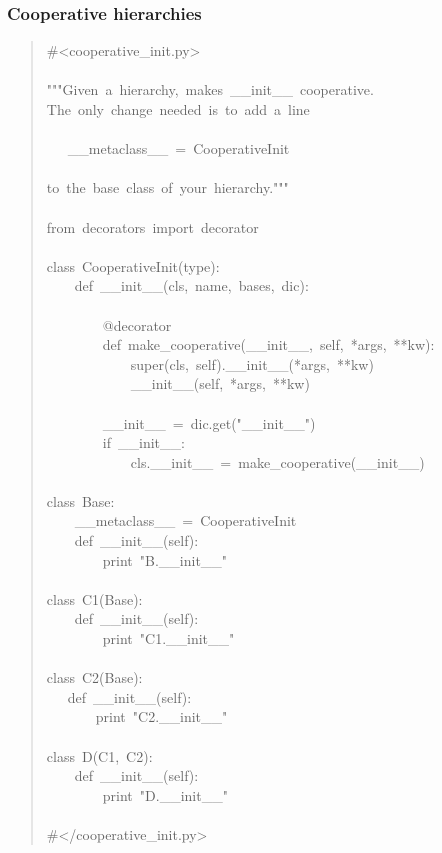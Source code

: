 \documentclass[10pt,a4paper,english]{article}
\begin{document}
\subsubsection*{Cooperative hierarchies}
\begin{quote}{\ttfamily \raggedright \noindent
{\#}<cooperative{\_}init.py>~\\
~\\
"{}"{}"Given~a~hierarchy,~makes~{\_}{\_}init{\_}{\_}~cooperative.~\\
The~only~change~needed~is~to~add~a~line~\\
~\\
~~~{\_}{\_}metaclass{\_}{\_}~=~CooperativeInit~\\
~\\
to~the~base~class~of~your~hierarchy."{}"{}"~\\
~\\
from~decorators~import~decorator~~\\
~\\
class~CooperativeInit(type):~\\
~~~~def~{\_}{\_}init{\_}{\_}(cls,~name,~bases,~dic):~\\
~\\
~~~~~~~~@decorator~\\
~~~~~~~~def~make{\_}cooperative({\_}{\_}init{\_}{\_},~self,~*args,~**kw):~\\
~~~~~~~~~~~~super(cls,~self).{\_}{\_}init{\_}{\_}(*args,~**kw)~\\
~~~~~~~~~~~~{\_}{\_}init{\_}{\_}(self,~*args,~**kw)~\\
~\\
~~~~~~~~{\_}{\_}init{\_}{\_}~=~dic.get("{\_}{\_}init{\_}{\_}")~\\
~~~~~~~~if~{\_}{\_}init{\_}{\_}:~\\
~~~~~~~~~~~~cls.{\_}{\_}init{\_}{\_}~=~make{\_}cooperative({\_}{\_}init{\_}{\_})~\\
~\\
class~Base:~\\
~~~~{\_}{\_}metaclass{\_}{\_}~=~CooperativeInit~\\
~~~~def~{\_}{\_}init{\_}{\_}(self):~\\
~~~~~~~~print~"B.{\_}{\_}init{\_}{\_}"~\\
~\\
class~C1(Base):~\\
~~~~def~{\_}{\_}init{\_}{\_}(self):~\\
~~~~~~~~print~"C1.{\_}{\_}init{\_}{\_}"~\\
~\\
class~C2(Base):~\\
~~~def~{\_}{\_}init{\_}{\_}(self):~\\
~~~~~~~print~"C2.{\_}{\_}init{\_}{\_}"~\\
~\\
class~D(C1,~C2):~\\
~~~~def~{\_}{\_}init{\_}{\_}(self):~\\
~~~~~~~~print~"D.{\_}{\_}init{\_}{\_}"~\\
~\\
{\#}</cooperative{\_}init.py>
}\end{quote}
\end{document}
